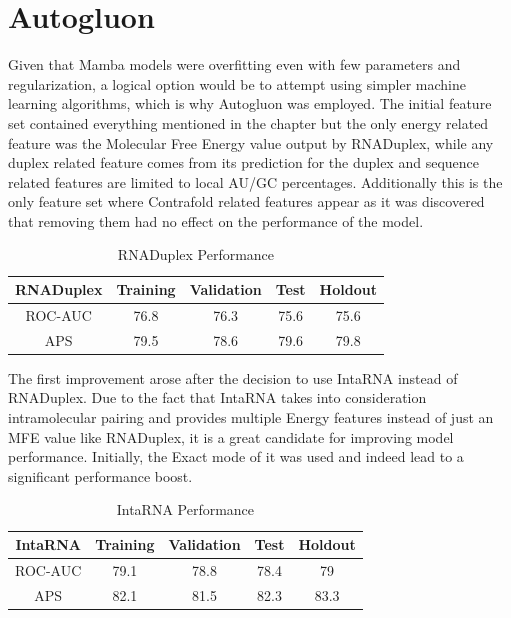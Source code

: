 \documentclass[en,ack]{dimscthesis}
\begin{document}
\section{Autogluon}
Given that Mamba models were overfitting even with few parameters and regularization, a logical option would be to attempt using simpler machine learning algorithms, which is why Autogluon was employed. The initial feature set contained everything mentioned in the  chapter but the only energy related feature was the Molecular Free Energy value output by RNADuplex, while any duplex related feature comes from its prediction for the duplex and sequence related features are limited to local AU/GC percentages. Additionally this is the only feature set where Contrafold related features appear as it was discovered that removing them had no effect on the performance of the model. 

\begin{table}[H]
    \caption{RNADuplex Performance}
    \label{tbl:RNADuplex Performance}
    \begin{center} %
        \begin{tabular}{c|c|c|c|c}
            \textbf{RNADuplex} & \textbf{Training} & \textbf{Validation}& \textbf{Test}& \textbf{Holdout} \\
            \hline
			ROC-AUC & 76.8 & 76.3 & 75.6 & 75.6 \\
			APS & 79.5 & 78.6 & 79.6 & 79.8 \\
            \hline
        \end{tabular}
    \end{center}
\end{table}

The first improvement arose after the decision to use IntaRNA instead of RNADuplex. Due to the fact that IntaRNA takes into consideration intramolecular pairing and provides multiple Energy features instead of just an MFE value like RNADuplex, it is a great candidate for improving model performance. Initially, the Exact mode of it was used and indeed lead to a significant performance boost.

\begin{table}[H]
    \caption{IntaRNA Performance}
    \label{tbl:IntaRNA Performance}
    \begin{center} %
        \begin{tabular}{c|c|c|c|c}
            \textbf{IntaRNA} & \textbf{Training} & \textbf{Validation}& \textbf{Test}& \textbf{Holdout} \\
            \hline
			ROC-AUC & 79.1 & 78.8 & 78.4 & 79 \\
			APS & 82.1 & 81.5 & 82.3 & 83.3 \\
            \hline
        \end{tabular}
    \end{center}
\end{table}
\end{document}
